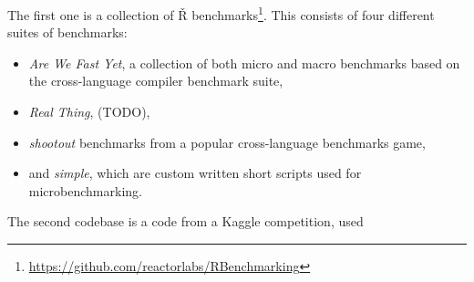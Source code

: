 The first one is a collection of Ř benchmarks\footnote{\url{https://github.com/reactorlabs/RBenchmarking}}. This consists of four different suites of benchmarks:
\begin{itemize}
	\item{} \textit{Are We Fast Yet}, a collection of both micro and macro benchmarks based on the cross-language compiler benchmark suite\todocite,
	\item{} \textit{Real Thing}, (TODO),
	\item{} \textit{shootout} benchmarks from a popular cross-language benchmarks game\todocite,
	\item{} and \textit{simple}, which are custom written short scripts used for microbenchmarking.
\end{itemize}

The second codebase is a code from a Kaggle competition, used \todoadd
